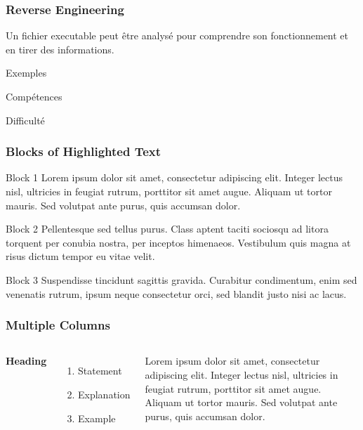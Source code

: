 \documentclass{beamer}
\begin{document}

\begin{frame}
\frametitle{Reverse Engineering}

Un fichier executable peut être analysé pour comprendre son fonctionnement et en tirer des informations.

\begin{block}{Exemples}
\end{block}

\begin{block}{Compétences}
\end{block}

\begin{block}{Difficulté}
\end{block}

\end{frame}


\begin{frame}
\frametitle{Blocks of Highlighted Text}
\begin{block}{Block 1}
Lorem ipsum dolor sit amet, consectetur adipiscing elit. Integer lectus nisl, ultricies in feugiat rutrum, porttitor sit amet augue. Aliquam ut tortor mauris. Sed volutpat ante purus, quis accumsan dolor.
\end{block}

\begin{block}{Block 2}
Pellentesque sed tellus purus. Class aptent taciti sociosqu ad litora torquent per conubia nostra, per inceptos himenaeos. Vestibulum quis magna at risus dictum tempor eu vitae velit.
\end{block}

\begin{block}{Block 3}
Suspendisse tincidunt sagittis gravida. Curabitur condimentum, enim sed venenatis rutrum, ipsum neque consectetur orci, sed blandit justo nisi ac lacus.
\end{block}
\end{frame}


\begin{frame}
\frametitle{Multiple Columns}
\begin{columns}[c] %

\textbf{Heading}
\begin{enumerate}
\item Statement
\item Explanation
\item Example
\end{enumerate}

Lorem ipsum dolor sit amet, consectetur adipiscing elit. Integer lectus nisl, ultricies in feugiat rutrum, porttitor sit amet augue. Aliquam ut tortor mauris. Sed volutpat ante purus, quis accumsan dolor.

\end{columns}
\end{frame}
\end{document}

